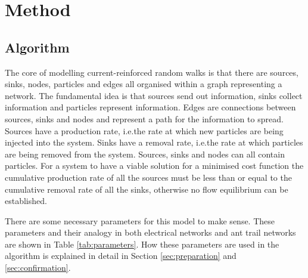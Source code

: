 \section{Method}
\label{sec:method}
\subsection{Algorithm}
The core of modelling current-reinforced random walks is that there are sources, sinks, nodes, particles and edges all organised within a graph representing a network. The fundamental idea is that sources send out information, sinks collect information and particles represent information. Edges are connections between sources, sinks and nodes and represent a path for the information to spread. Sources have a production rate, i.e.\@ the rate at which new particles are being injected into the system. Sinks have a removal rate, i.e.\@ the rate at which particles are being removed from the system. Sources, sinks and nodes can all contain particles. For a system to have a viable solution for a minimised cost function the cumulative production rate of all the sources must be less than or equal to the cumulative removal rate of all the sinks, otherwise no flow equilibrium can be established.

There are some necessary parameters for this model to make sense. These parameters and their analogy in both electrical networks and ant trail networks are shown in Table \ref{tab:parameters}. How these parameters are used in the algorithm is explained in detail in Section \ref{sec:preparation} and \ref{sec:confirmation}.


